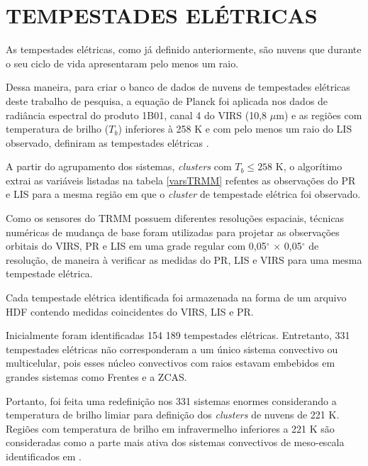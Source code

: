 \section{TEMPESTADES ELÉTRICAS}
\label{identificaTempestades}



As tempestades elétricas, como já definido anteriormente, são nuvens que durante o seu ciclo de vida apresentaram pelo menos um raio.

Dessa maneira, para criar o banco de dados de nuvens de tempestades elétricas deste trabalho de pesquisa, a equação de Planck foi aplicada nos dados de radiância espectral do produto 1B01, canal 4 do VIRS (10,8 $\mu$m) e as regiões com temperatura de brilho ($T_b$) inferiores à 258 K e com pelo menos um raio do LIS observado, definiram as tempestades elétricas \cite{morales2003}.



A partir do agrupamento dos sistemas, \textit{clusters} com $T_b \leq 258$ K, o algorítimo extrai as variáveis listadas na tabela \ref{varsTRMM} refentes as observações do PR e LIS para a mesma região em que o \textit{cluster} de tempestade elétrica foi observado.

Como os sensores do TRMM possuem diferentes resoluções espaciais, técnicas numéricas de mudança de base foram utilizadas para projetar as observações orbitais do VIRS, PR e LIS em uma grade regular com 0,05$^{\circ}$ $\times$ 0,05$^{\circ}$ de resolução, de maneira à verificar as medidas do PR, LIS e VIRS para uma mesma tempestade elétrica. 

Cada tempestade elétrica identificada foi armazenada na forma de um arquivo HDF contendo medidas coincidentes do VIRS, LIS e PR. 

Inicialmente foram identificadas {154 189} tempestades elétricas. Entretanto, 331 tempestades elétricas não corresponderam a um único sistema convectivo ou multicelular, pois esses núcleo convectivos com raios estavam embebidos em grandes sistemas como Frentes e a ZCAS. 

Portanto, foi feita uma redefinição nos 331 sistemas enormes considerando a temperatura de brilho limiar para definição dos \textit{clusters} de nuvens de 221 K. Regiões com temperatura de brilho em infravermelho inferiores a 221 K são consideradas como a parte mais ativa dos sistemas convectivos de meso-escala identificados em . 


